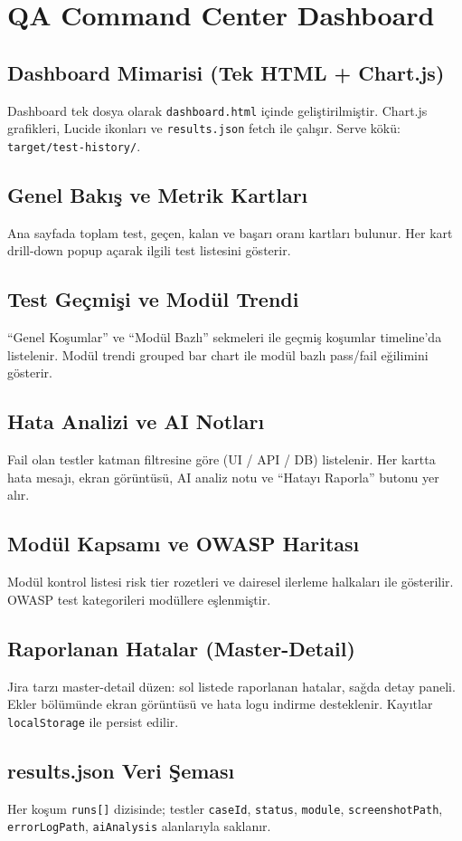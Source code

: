 \chapter{QA Command Center Dashboard}

\section{Dashboard Mimarisi (Tek HTML + Chart.js)}
Dashboard tek dosya olarak \texttt{dashboard.html} içinde geliştirilmiştir. Chart.js grafikleri, Lucide ikonları ve \texttt{results.json} fetch ile çalışır. Serve kökü: \texttt{target/test-history/}.

\section{Genel Bakış ve Metrik Kartları}
Ana sayfada toplam test, geçen, kalan ve başarı oranı kartları bulunur. Her kart drill-down popup açarak ilgili test listesini gösterir.

\section{Test Geçmişi ve Modül Trendi}
``Genel Koşumlar'' ve ``Modül Bazlı'' sekmeleri ile geçmiş koşumlar timeline'da listelenir. Modül trendi grouped bar chart ile modül bazlı pass/fail eğilimini gösterir.

\section{Hata Analizi ve AI Notları}
Fail olan testler katman filtresine göre (UI / API / DB) listelenir. Her kartta hata mesajı, ekran görüntüsü, AI analiz notu ve ``Hatayı Raporla'' butonu yer alır.

\section{Modül Kapsamı ve OWASP Haritası}
Modül kontrol listesi risk tier rozetleri ve dairesel ilerleme halkaları ile gösterilir. OWASP test kategorileri modüllere eşlenmiştir.

\section{Raporlanan Hatalar (Master-Detail)}
Jira tarzı master-detail düzen: sol listede raporlanan hatalar, sağda detay paneli. Ekler bölümünde ekran görüntüsü ve hata logu indirme desteklenir. Kayıtlar \texttt{localStorage} ile persist edilir.

\section{results.json Veri Şeması}
Her koşum \texttt{runs[]} dizisinde; testler \texttt{caseId}, \texttt{status}, \texttt{module}, \texttt{screenshotPath}, \texttt{errorLogPath}, \texttt{aiAnalysis} alanlarıyla saklanır.

